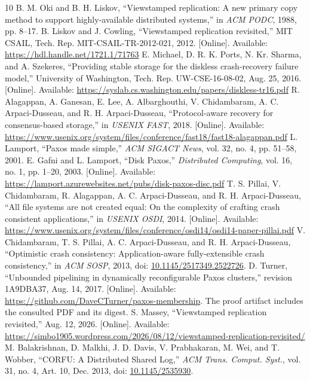 \documentclass[10pt,journal,letterpaper]{IEEEtran}
\begin{document}
\begin{thebibliography}{10}
 B. M. Oki and B. H. Liskov, ``Viewstamped replication: A new primary copy method to support highly-available distributed systems,'' in \emph{ACM PODC}, 1988, pp. 8--17.
 B. Liskov and J. Cowling, ``Viewstamped replication revisited,'' MIT CSAIL, Tech. Rep. MIT-CSAIL-TR-2012-021, 2012. [Online]. Available: \url{https://hdl.handle.net/1721.1/71763}
 E. Michael, D. R. K. Ports, N. Kr. Sharma, and A. Szekeres, ``Providing stable storage for the diskless crash-recovery failure model,'' University of Washington, Tech. Rep. UW-CSE-16-08-02, Aug. 25, 2016. [Online]. Available: \url{https://syslab.cs.washington.edu/papers/diskless-tr16.pdf}
 R. Alagappan, A. Ganesan, E. Lee, A. Albarghouthi, V. Chidambaram, A. C. Arpaci-Dusseau, and R. H. Arpaci-Dusseau, ``Protocol-aware recovery for consensus-based storage,'' in \emph{USENIX FAST}, 2018. [Online]. Available: \url{https://www.usenix.org/system/files/conference/fast18/fast18-alagappan.pdf}
 L. Lamport, ``Paxos made simple,'' \emph{ACM SIGACT News}, vol. 32, no. 4, pp. 51--58, 2001.
 E. Gafni and L. Lamport, ``Disk Paxos,'' \emph{Distributed Computing}, vol. 16, no. 1, pp. 1--20, 2003. [Online]. Available: \url{https://lamport.azurewebsites.net/pubs/disk-paxos-disc.pdf}
 T. S. Pillai, V. Chidambaram, R. Alagappan, A. C. Arpaci-Dusseau, and R. H. Arpaci-Dusseau, ``All file systems are not created equal: On the complexity of crafting crash consistent applications,'' in \emph{USENIX OSDI}, 2014. [Online]. Available: \url{https://www.usenix.org/system/files/conference/osdi14/osdi14-paper-pillai.pdf}
 V. Chidambaram, T. S. Pillai, A. C. Arpaci-Dusseau, and R. H. Arpaci-Dusseau, ``Optimistic crash consistency: Application-aware fully-extensible crash consistency,'' in \emph{ACM SOSP}, 2013, doi: \href{https://doi.org/10.1145/2517349.2522726}{10.1145/2517349.2522726}.
 D. Turner, ``Unbounded pipelining in dynamically reconfigurable Paxos clusters,'' revision 1A9DBA37, Aug. 14, 2017. [Online]. Available: \url{https://github.com/DaveCTurner/paxos-membership}. The proof artifact includes the consulted PDF and its digest.
 S. Massey, ``Viewstamped replication revisited,'' Aug. 12, 2026. [Online]. Available: \url{https://simbo1905.wordpress.com/2026/08/12/viewstamped-replication-revisited/}
 M. Balakrishnan, D. Malkhi, J. D. Davis, V. Prabhakaran, M. Wei, and T. Wobber, ``CORFU: A Distributed Shared Log,'' \emph{ACM Trans. Comput. Syst.}, vol. 31, no. 4, Art. 10, Dec. 2013, doi: \href{https://doi.org/10.1145/2535930}{10.1145/2535930}.

\end{thebibliography}
\end{document}
